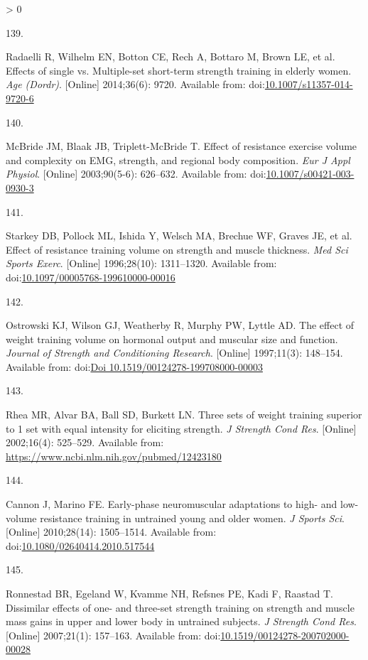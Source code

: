 \documentclass[twoside,10pt]{gihclass} %
\newlength{\cslhangindent}
\newlength{\csllabelwidth}
\newenvironment{CSLReferences}[3] %
 {%
  \setlength{\parindent}{0pt}
  \ifodd #1 \everypar{\setlength{\hangindent}{\cslhangindent}}\ignorespaces\fi
  \ifnum #2 > 0
  \setlength{\parskip}{#2\baselineskip}
  \fi
 }%
 {}
\newcommand{\CSLLeftMargin}[1]{\parbox[t]{\maxof{\widthof{#1}}{\csllabelwidth}}{#1}}
\newcommand{\CSLRightInline}[1]{\parbox[t]{\linewidth}{#1}}
\begin{document}
\begin{CSLReferences}{0}{0}
\leavevmode\hypertarget{ref-RN1518}{}%
\CSLLeftMargin{139. }
\CSLRightInline{Radaelli R, Wilhelm EN, Botton CE, Rech A, Bottaro M, Brown LE, et al. Effects of single vs. Multiple-set short-term strength training in elderly women. \emph{Age (Dordr)}. {[}Online{]} 2014;36(6): 9720. Available from: doi:\href{https://doi.org/10.1007/s11357-014-9720-6}{10.1007/s11357-014-9720-6}}

\leavevmode\hypertarget{ref-RN1474}{}%
\CSLLeftMargin{140. }
\CSLRightInline{McBride JM, Blaak JB, Triplett-McBride T. Effect of resistance exercise volume and complexity on EMG, strength, and regional body composition. \emph{Eur J Appl Physiol}. {[}Online{]} 2003;90(5-6): 626--632. Available from: doi:\href{https://doi.org/10.1007/s00421-003-0930-3}{10.1007/s00421-003-0930-3}}

\leavevmode\hypertarget{ref-RN1456}{}%
\CSLLeftMargin{141. }
\CSLRightInline{Starkey DB, Pollock ML, Ishida Y, Welsch MA, Brechue WF, Graves JE, et al. Effect of resistance training volume on strength and muscle thickness. \emph{Med Sci Sports Exerc}. {[}Online{]} 1996;28(10): 1311--1320. Available from: doi:\href{https://doi.org/10.1097/00005768-199610000-00016}{10.1097/00005768-199610000-00016}}

\leavevmode\hypertarget{ref-RN1454}{}%
\CSLLeftMargin{142. }
\CSLRightInline{Ostrowski KJ, Wilson GJ, Weatherby R, Murphy PW, Lyttle AD. The effect of weight training volume on hormonal output and muscular size and function. \emph{Journal of Strength and Conditioning Research}. {[}Online{]} 1997;11(3): 148--154. Available from: doi:\href{https://doi.org/Doi\%2010.1519/00124278-199708000-00003}{Doi 10.1519/00124278-199708000-00003}}

\leavevmode\hypertarget{ref-RN1384}{}%
\CSLLeftMargin{143. }
\CSLRightInline{Rhea MR, Alvar BA, Ball SD, Burkett LN. Three sets of weight training superior to 1 set with equal intensity for eliciting strength. \emph{J Strength Cond Res}. {[}Online{]} 2002;16(4): 525--529. Available from: \url{https://www.ncbi.nlm.nih.gov/pubmed/12423180}}

\leavevmode\hypertarget{ref-RN1382}{}%
\CSLLeftMargin{144. }
\CSLRightInline{Cannon J, Marino FE. Early-phase neuromuscular adaptations to high- and low-volume resistance training in untrained young and older women. \emph{J Sports Sci}. {[}Online{]} 2010;28(14): 1505--1514. Available from: doi:\href{https://doi.org/10.1080/02640414.2010.517544}{10.1080/02640414.2010.517544}}

\leavevmode\hypertarget{ref-RN776}{}%
\CSLLeftMargin{145. }
\CSLRightInline{Ronnestad BR, Egeland W, Kvamme NH, Refsnes PE, Kadi F, Raastad T. Dissimilar effects of one- and three-set strength training on strength and muscle mass gains in upper and lower body in untrained subjects. \emph{J Strength Cond Res}. {[}Online{]} 2007;21(1): 157--163. Available from: doi:\href{https://doi.org/10.1519/00124278-200702000-00028}{10.1519/00124278-200702000-00028}}


\end{CSLReferences}
\end{document}
